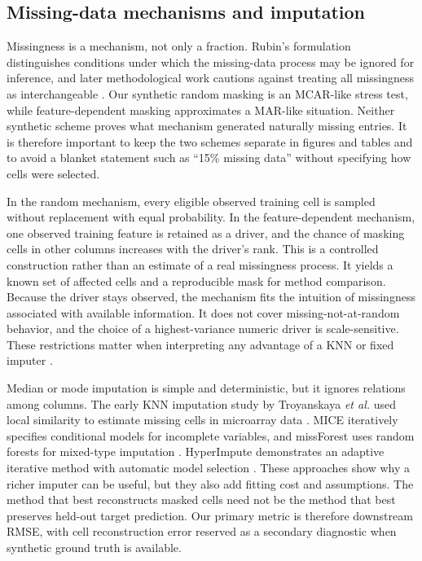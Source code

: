 \documentclass[conference]{IEEEtran}
\begin{document}
\subsection{Missing-data mechanisms and imputation}
Missingness is a mechanism, not only a fraction. Rubin's formulation distinguishes conditions under which the missing-data process may be ignored for inference, and later methodological work cautions against treating all missingness as interchangeable \cite{Rubin1976,Schafer2002}. Our synthetic random masking is an MCAR-like stress test, while feature-dependent masking approximates a MAR-like situation. Neither synthetic scheme proves what mechanism generated naturally missing entries. It is therefore important to keep the two schemes separate in figures and tables and to avoid a blanket statement such as ``15\% missing data'' without specifying how cells were selected.

In the random mechanism, every eligible observed training cell is sampled without replacement with equal probability. In the feature-dependent mechanism, one observed training feature is retained as a driver, and the chance of masking cells in other columns increases with the driver's rank. This is a controlled construction rather than an estimate of a real missingness process. It yields a known set of affected cells and a reproducible mask for method comparison. Because the driver stays observed, the mechanism fits the intuition of missingness associated with available information. It does not cover missing-not-at-random behavior, and the choice of a highest-variance numeric driver is scale-sensitive. These restrictions matter when interpreting any advantage of a KNN or fixed imputer \cite{Rubin1976,Schafer2002}.

Median or mode imputation is simple and deterministic, but it ignores relations among columns. The early KNN imputation study by Troyanskaya \emph{et al.} used local similarity to estimate missing cells in microarray data \cite{Troyanskaya2001}. MICE iteratively specifies conditional models for incomplete variables, and missForest uses random forests for mixed-type imputation \cite{vanBuuren2011,Stekhoven2012}. HyperImpute demonstrates an adaptive iterative method with automatic model selection \cite{Jarrett2022}. These approaches show why a richer imputer can be useful, but they also add fitting cost and assumptions. The method that best reconstructs masked cells need not be the method that best preserves held-out target prediction. Our primary metric is therefore downstream RMSE, with cell reconstruction error reserved as a secondary diagnostic when synthetic ground truth is available.
\end{document}
